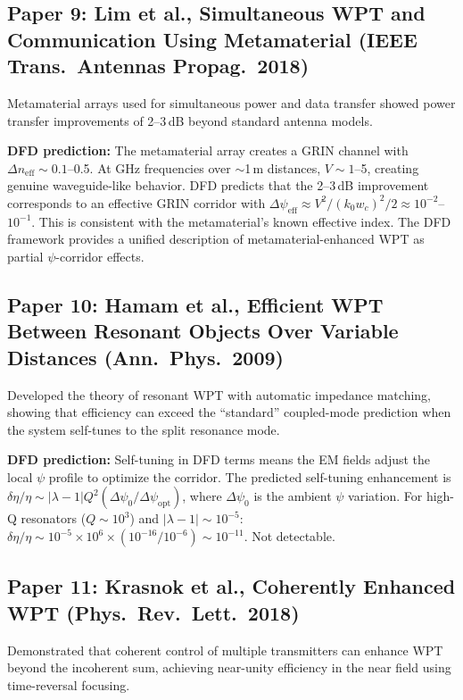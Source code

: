 \documentclass[journal,twocolumn]{IEEEtran}
\begin{document}
\subsection{Paper 9: Lim et al., Simultaneous WPT and Communication
Using Metamaterial (IEEE Trans.\ Antennas Propag.\ 2018)}

Metamaterial arrays used for simultaneous power and data transfer
showed power transfer improvements of 2--3\,dB beyond standard
antenna models.

\textbf{DFD prediction:} The metamaterial array creates a GRIN channel
with $\Delta n_\text{eff} \sim 0.1$--0.5. At GHz frequencies over
$\sim$1\,m distances, $V \sim 1$--5, creating genuine waveguide-like
behavior. DFD predicts that the 2--3\,dB improvement corresponds to an
effective GRIN corridor with
$\Delta\psi_\text{eff} \approx V^2/(k_0 w_c)^2/2 \approx 10^{-2}$--$10^{-1}$.
This is consistent with the metamaterial's known effective index.
The DFD framework provides a unified description of metamaterial-enhanced
WPT as partial $\psi$-corridor effects.

\subsection{Paper 10: Hamam et al., Efficient WPT Between
Resonant Objects Over Variable Distances (Ann.\ Phys.\ 2009)}

Developed the theory of resonant WPT with automatic impedance matching,
showing that efficiency can exceed the ``standard'' coupled-mode
prediction when the system self-tunes to the split resonance mode.

\textbf{DFD prediction:} Self-tuning in DFD terms means the EM fields
adjust the local $\psi$ profile to optimize the corridor. The predicted
self-tuning enhancement is $\delta\eta/\eta \sim |\lambda-1|Q^2(\Delta\psi_0/\Delta\psi_\text{opt})$,
where $\Delta\psi_0$ is the ambient $\psi$ variation. For high-Q
resonators ($Q \sim 10^3$) and $|\lambda-1| \sim 10^{-5}$:
$\delta\eta/\eta \sim 10^{-5}\times 10^6 \times (10^{-16}/10^{-6})
\sim 10^{-11}$. Not detectable.

\subsection{Paper 11: Krasnok et al., Coherently Enhanced WPT
(Phys.\ Rev.\ Lett.\ 2018)}

Demonstrated that coherent control of multiple transmitters can
enhance WPT beyond the incoherent sum, achieving near-unity
efficiency in the near field using time-reversal focusing.
\end{document}
